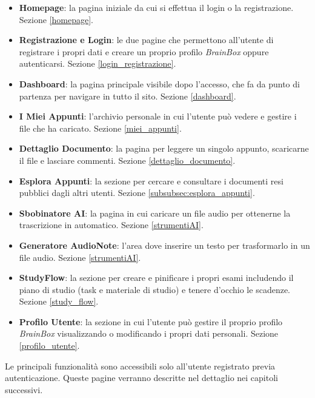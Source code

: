 \begin{itemize}
    \item \textbf{Homepage}: la pagina iniziale da cui si effettua il login o la registrazione. Sezione \ref{homepage}.
    
    \item \textbf{Registrazione e Login}: le due pagine che permettono all'utente di registrare i propri dati e creare un proprio profilo \textit{BrainBox} oppure autenticarsi. Sezione \ref{login_registrazione}.
    
    \item \textbf{Dashboard}: la pagina principale visibile dopo l'accesso, che fa da punto di partenza per navigare in tutto il sito. Sezione \ref{dashboard}.
    
    \item \textbf{I Miei Appunti}:  l'archivio personale in cui l'utente può vedere e gestire i file che ha caricato. Sezione \ref{miei_appunti}.
    
    \item \textbf{Dettaglio Documento}: la pagina per leggere un singolo appunto, scaricarne il file e lasciare commenti. Sezione \ref{dettaglio_documento}.
    
    \item \textbf{Esplora Appunti}: la sezione per cercare e consultare i documenti resi pubblici dagli altri utenti. Sezione \ref{subsubsec:esplora_appunti}.
    
    \item \textbf{Sbobinatore AI}: la pagina in cui caricare un file audio per ottenerne la trascrizione in automatico. Sezione \ref{strumentiAI}.
    
    \item \textbf{Generatore AudioNote}: l'area dove inserire un testo per trasformarlo in un file audio. Sezione \ref{strumentiAI}.
    
    \item \textbf{StudyFlow}: la sezione per creare e pinificare i propri esami includendo il piano di studio (task e materiale di studio) e tenere d'occhio le scadenze. Sezione \ref{study_flow}.
    
    \item \textbf{Profilo Utente}: la sezione in cui l'utente può gestire il proprio profilo \textit{BrainBox} visualizzando o modificando i propri dati personali. Sezione \ref{profilo_utente}.
\end{itemize}

Le principali funzionalità sono accessibili solo all'utente registrato previa autenticazione. Queste pagine verranno descritte nel dettaglio nei capitoli successivi.

